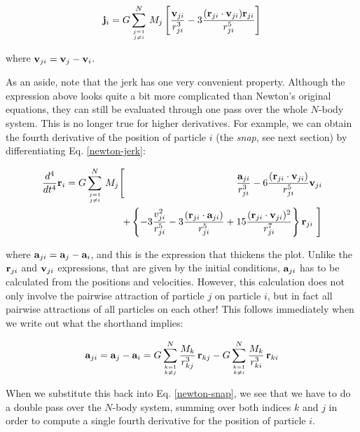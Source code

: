 \begin{equation}
\bj_i =  G \sum_{j=1 \atop j \neq i}^N \,M_j \left[
\frac{\bv_{ji}}{r_{ji}^3} - 3 \frac{(\br_{ji}\cdot\bv_{ji})\br_{ji}}{r_{ji}^5}
\right]\label{newton-jerk}
\end{equation}

\noindent
where ${\bf v}_{ji} = {\bf v}_j - {\bf v}_i$.

As an aside, note that the jerk has one very convenient property.
Although the expression above looks quite a bit more complicated than
Newton's original equations, they can still be evaluated through one
pass over the whole $N$-body system.  This is no longer true for
higher derivatives.  For example, we can obtain the fourth derivative
of the position of particle $i$ (the {\it snap}, see next section) by
differentiating Eq. \ref{newton-jerk}:

\begin{eqnarray}
\frac{d^4}{dt^4}\br_i = G \sum_{j=1 \atop j \neq i}^N \,M_j \Bigg[ &\,&
\!\!\!\!\!\!\!\!\!\! \frac{\ba_{ji}}{r_{ji}^3}
-6 \frac{(\br_{ji}\cdot\bv_{ji})}{r_{ji}^5}\bv_{ji} \nonumber \\
 &\,& \!\!\!\!\!\!\!\! + \left\{ -3\frac{v_{ji}^2}{r_{ji}^5}
-3 \frac{(\br_{ji}\cdot\ba_{ji})}{r_{ji}^5}
+15 \frac{(\br_{ji}\cdot\bv_{ji})^2}{r_{ji}^7} \right\} \br_{ji} \,\,\Bigg]
\label{newton-snap}
\end{eqnarray}

\noindent
where ${\bf a}_{ji} = {\bf a}_j - {\bf a}_i$, and this is the expression that
thickens the plot.  Unlike the ${\bf r}_{ji}$ and ${\bf v}_{ji}$ expressions,
that are given by the initial conditions, ${\bf a}_{ji}$ has to be
calculated from the positions and velocities.  However, this
calculation does not only involve the pairwise attraction of particle
$j$ on particle $i$, but in fact all pairwise attractions of all
particles on each other!  This follows immediately when we write out
what the shorthand implies:

\begin{equation}
{\bf a}_{ji} = {\bf a}_j - {\bf a}_i = G \sum_{k=1 \atop k \neq j}^N
\frac{M_k}{r_{kj}^3} \,{\bf r}_{kj} -  G \sum_{k=1 \atop k \neq i}^N
\frac{M_k}{r_{ki}^3} \,{\bf r}_{ki}
\end{equation}

\noindent
When we substitute this back into Eq. \ref{newton-snap}, we see that
we have to do a double pass over the $N$-body system, summing over
both indices $k$ and $j$ in order to compute a single fourth derivative
for the position of particle $i$.  

